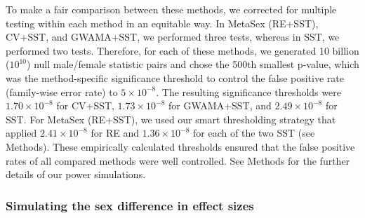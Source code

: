 \documentclass[11pt]{article}
\begin{document}
To make a fair comparison between these methods, 
we corrected for multiple testing within each method 
in an equitable way. 
In MetaSex (RE+SST), CV+SST, and GWAMA+SST, we performed three tests, 
whereas in SST, we performed two tests.
Therefore, for each of these methods,
we generated 10 billion ($10^{10}$) null male/female statistic pairs 
and chose the 500th smallest p-value, which was the method-specific
significance threshold to control the false positive rate (family-wise error rate) to $5\times10^{-8}$.
The resulting significance thresholds were
$1.70\times10^{-8}$ for CV+SST, 
$1.73\times10^{-8}$ for GWAMA+SST, 
and $2.49\times10^{-8}$ for SST.
For MetaSex (RE+SST), we used our smart thresholding strategy that applied
$2.41 \times 10^{-8}$ for RE and $1.36 \times 10^{-8}$ for each of the two SST (see Methods).
These empirically calculated thresholds ensured that the false positive rates of all compared methods
were well controlled.
See Methods for the further details of our power simulations.

%
%
%
%

\subsubsection*{Simulating the sex difference in effect sizes}
\end{document}
